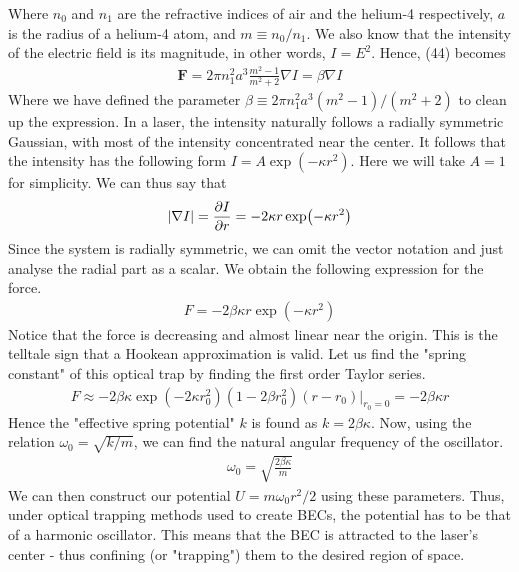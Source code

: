\documentclass{article}
\newcommand{\ve}{\mathbf}
\begin{document}
Where $n_0$ and $n_1$ are the refractive indices of air and the helium-4 respectively, $a$ is the radius of a helium-4 atom,
 and $m\equiv n_0/n_1$. 
We also know that the intensity of the electric field is its magnitude, in other words,  $I=E^2$. Hence, (44) becomes 
\begin{align}
    \ve{F}=2\pi n_1^2a^3\frac{m^2-1}{m^2+2}\nabla I=\beta\nabla I
\end{align}
Where we have defined the parameter $\beta\equiv  2\pi n_1^2a^3 (m^2-1)/(m^2+2)$ to clean up the expression. 
In a laser, the intensity naturally follows a radially symmetric Gaussian, with most of the intensity concentrated
near the center. It follows that the intensity has the following form $I=A\exp(-\kappa r^2)$. 
Here we will take $A=1$ for simplicity. We can thus say that 
\begin{align}
    |\nabla I|=\pdv{I}{r}=-2\kappa r\exp(-\kappa r^2)
\end{align}
Since the system is radially symmetric, we can omit the vector notation and just analyse the radial part as a scalar. We obtain the following expression for the force. 
\begin{align}
    F=-2\beta\kappa r\exp(-\kappa r^2)
\end{align}
Notice that the force is decreasing and almost linear near the origin. This is the telltale sign that a Hookean approximation is valid. 
Let us find the "spring constant" of this optical trap by finding the first order Taylor series. 
\begin{align}
    F\approx -2\beta\kappa\exp(-2\kappa r_0^2)(1-2\beta r_0^2)(r-r_0)\bigg|_{r_0=0}=-2\beta\kappa r
\end{align}
Hence the "effective spring potential" $k$ is found as $k=2\beta\kappa$. Now, using the relation $\omega_0=\sqrt{k/m}$,
we can find the natural angular frequency of the oscillator. 
\begin{align}
    \omega_0=\sqrt{\frac{2\beta\kappa}{m}}
\end{align}
We can then construct our potential $U=m\omega_0r^2/2$ using these parameters. 
Thus, under optical trapping methods used to create BECs, the 
potential has to be that of a harmonic oscillator. This means that the BEC is attracted to 
the laser's center - thus confining (or "trapping") them to the desired region of space. 
\end{document}
